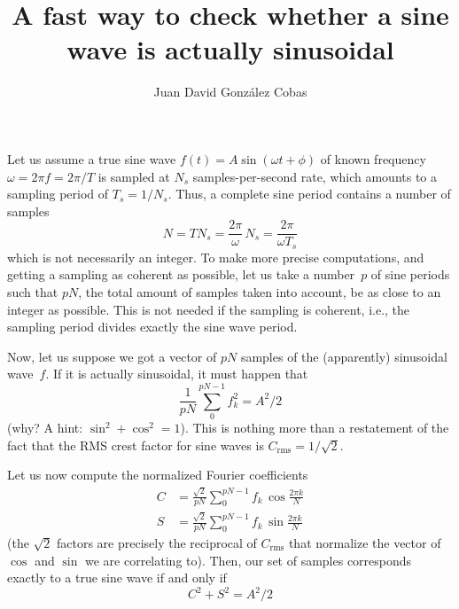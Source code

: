 \documentclass{article}
\title{A fast way to check whether a sine wave is actually sinusoidal}
\author{Juan David Gonz\'{a}lez Cobas}
\begin{document}
\maketitle
Let us assume a true sine wave $f(t) = A \sin(\omega t + \phi)$
of known frequency $\omega = 2\pi f = 2\pi/T$ is sampled at
$N_s$ samples-per-second rate, which amounts to a sampling period of
$T_s = 1/N_s$.
Thus, a complete sine period contains a number of samples
\begin{equation}
	N = T N_s = \frac{2\pi}{\omega} \, N_s =
	 \frac{2\pi}{\omega T_s}
\end{equation}
which is not necessarily an integer. To make more precise computations,
and getting a sampling as coherent as possible,
let us take a number~$p$  of sine periods
such that $pN$, the total amount of samples taken into account,
be as close to an integer as possible. This is not needed if the
sampling is coherent, i.e., the sampling period divides exactly the sine
wave period.

Now, let us suppose we got a vector of $pN$ samples of the (apparently)
sinusoidal wave~$f$. If it is actually sinusoidal, it must happen that
\begin{equation}
	\frac{1}{pN} \sum_0^{pN-1} f_k^2 = A^2/2
\end{equation}
(why? A hint: $\sin^2 + \cos^2 = 1$). This is nothing more than a
restatement of the fact that the RMS crest factor for sine waves
is $C_\text{rms} = 1/\sqrt 2$.

Let us now compute the normalized Fourier coefficients
\begin{align}
	C &= \frac{\sqrt 2}{pN} \sum_0^{pN-1} f_k \,\cos \frac{2\pi k}{N} \\
	S &= \frac{\sqrt 2}{pN} \sum_0^{pN-1} f_k \,\sin \frac{2\pi k}{N}
\end{align}
(the $\sqrt 2$ factors are precisely the reciprocal of $C_\text{rms}$
that normalize the vector of $\cos$ and $\sin$ we are correlating to).
Then, our set of samples corresponds exactly to a true sine wave if and
only if
\begin{equation}
	C^2 + S^2 = A^2/2
\end{equation}
\end{document}
